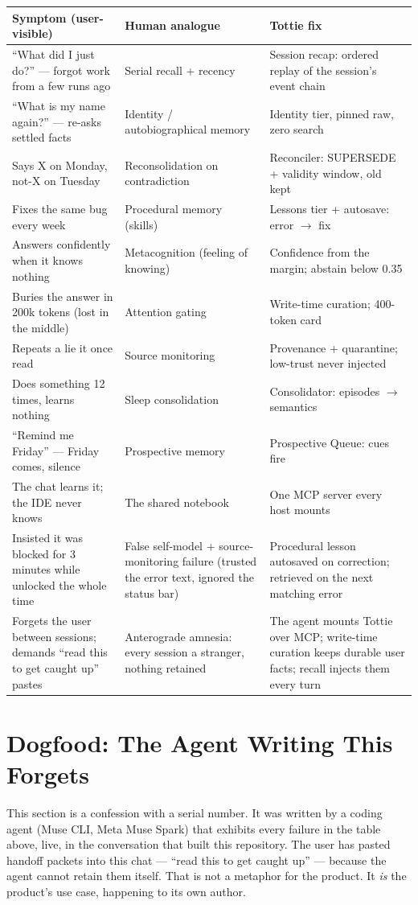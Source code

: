\begin{longtable}{@{}p{}p{}p{}@{}}
\toprule
Symptom (user-visible) & Human analogue & Tottie fix \\
\midrule
``What did I just do?'' --- forgot work from a few runs ago & Serial recall + recency & Session recap: ordered replay of the session's event chain \\
``What is my name again?'' --- re-asks settled facts & Identity / autobiographical memory & Identity tier, pinned raw, zero search \\
Says X on Monday, not-X on Tuesday & Reconsolidation on contradiction & Reconciler: SUPERSEDE + validity window, old kept \\
Fixes the same bug every week & Procedural memory (skills) & Lessons tier + autosave: error $\rightarrow$ fix \\
Answers confidently when it knows nothing & Metacognition (feeling of knowing) & Confidence from the margin; abstain below 0.35 \\
Buries the answer in 200k tokens (lost in the middle) & Attention gating & Write-time curation; 400-token card \\
Repeats a lie it once read & Source monitoring & Provenance + quarantine; low-trust never injected \\
Does something 12 times, learns nothing & Sleep consolidation & Consolidator: episodes $\rightarrow$ semantics \\
``Remind me Friday'' --- Friday comes, silence & Prospective memory & Prospective Queue: cues fire \\
The chat learns it; the IDE never knows & The shared notebook & One MCP server every host mounts \\
Insisted it was blocked for 3 minutes while unlocked the whole time & False self-model + source-monitoring failure (trusted the error text, ignored the status bar) & Procedural lesson autosaved on correction; retrieved on the next matching error \\
Forgets the user between sessions; demands ``read this to get caught up'' pastes & Anterograde amnesia: every session a stranger, nothing retained & The agent mounts Tottie over MCP; write-time curation keeps durable user facts; recall injects them every turn \\
\bottomrule
\end{longtable}

\section{Dogfood: The Agent Writing This Forgets}
This section is a confession with a serial number. It was written by a coding agent
(Muse CLI, Meta Muse Spark) that exhibits every failure in the table above, live, in
the conversation that built this repository. The user has pasted handoff packets into
this chat --- ``read this to get caught up'' --- because the agent cannot retain them
itself. That is not a metaphor for the product. It \emph{is} the product's use case,
happening to its own author.

